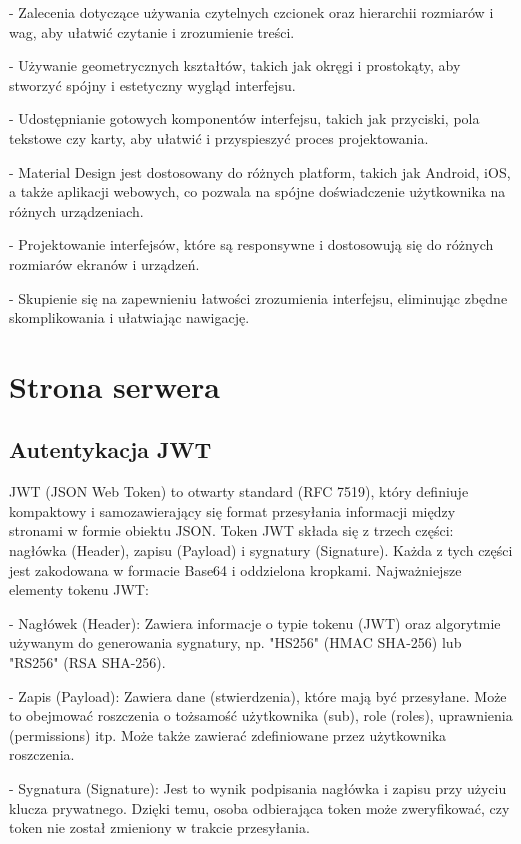 \documentclass[a4paper,twoside,12pt]{book}
\begin{document}
- Zalecenia dotyczące używania czytelnych czcionek oraz hierarchii rozmiarów i wag, aby ułatwić czytanie i zrozumienie treści.

- Używanie geometrycznych kształtów, takich jak okręgi i prostokąty, aby stworzyć spójny i estetyczny wygląd interfejsu.

- Udostępnianie gotowych komponentów interfejsu, takich jak przyciski, pola tekstowe czy karty, aby ułatwić i przyspieszyć proces projektowania.

- Material Design jest dostosowany do różnych platform, takich jak Android, iOS, a także aplikacji webowych, co pozwala na spójne doświadczenie użytkownika na różnych urządzeniach.

- Projektowanie interfejsów, które są responsywne i dostosowują się do różnych rozmiarów ekranów i urządzeń.

- Skupienie się na zapewnieniu łatwości zrozumienia interfejsu, eliminując zbędne skomplikowania i ułatwiając nawigację.

\section{Strona serwera}
\subsection{Autentykacja JWT}
JWT (JSON Web Token) to otwarty standard (RFC 7519), który definiuje kompaktowy
i samozawierający się format przesyłania informacji między stronami w formie
obiektu JSON. Token JWT składa się z trzech części: nagłówka (Header),
zapisu (Payload) i sygnatury (Signature). Każda z tych części jest zakodowana w
formacie Base64 i oddzielona kropkami. Najważniejsze elementy tokenu JWT:

- Nagłówek (Header):
    Zawiera informacje o typie tokenu (JWT) oraz algorytmie używanym do generowania sygnatury, np. "HS256" (HMAC SHA-256) lub "RS256" (RSA SHA-256).

- Zapis (Payload):
    Zawiera dane (stwierdzenia), które mają być przesyłane. Może to obejmować roszczenia o tożsamość użytkownika (sub), role (roles), uprawnienia (permissions) itp. Może także zawierać zdefiniowane przez użytkownika roszczenia.

- Sygnatura (Signature):
    Jest to wynik podpisania nagłówka i zapisu przy użyciu klucza prywatnego. Dzięki temu, osoba odbierająca token może zweryfikować, czy token nie został zmieniony w trakcie przesyłania.
\end{document}
